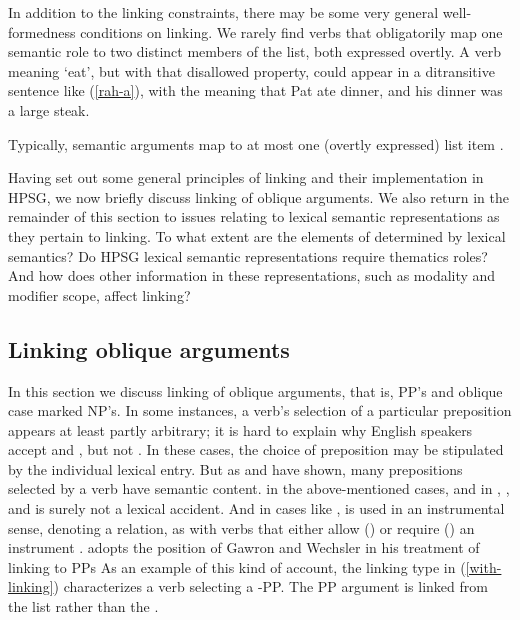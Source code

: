 \documentclass[output=paper
                ,modfonts
                ,nonflat
	        ,collection
	        ,collectionchapter
	        ,collectiontoclongg
 	        ,biblatex
                ,babelshorthands
                ,newtxmath
                ,draftmode
                ,colorlinks, citecolor=brown
]{./langsci/langscibook}
\begin{document}
In addition to the linking constraints, there may be some very general well-formedness conditions on linking.  We rarely find verbs that obligatorily map one semantic role to two distinct members of the \argst list, both expressed overtly.  A verb meaning `eat', but with that disallowed property, could appear in a ditransitive sentence like (\ref{rah-a}), with the meaning that Pat ate dinner, and his dinner was a large steak.  

\begin{exe}
\label{rah-a} 
\end{exe}

\noindent
Typically, semantic arguments map to at most one (overtly expressed) \argst list item \citep[262-268]{Davis2001}.

Having set out some general principles of linking and their implementation in HPSG, we now briefly discuss linking of oblique arguments.
We also return in the remainder of this section to issues relating to lexical semantic representations as they pertain to linking.
To what extent are the elements of \argst determined by lexical semantics?
Do HPSG lexical semantic representations require thematics roles?
And how does other information in these representations, such as modality and modifier scope, affect linking?

\subsection{Linking oblique arguments}
In this section we discuss linking of oblique arguments, that is, PP's and oblique case marked NP's.
In some instances, a verb's selection of a particular preposition appears at least partly arbitrary;
it is hard to explain why English speakers accept  and , but  not .
In these cases, the choice of preposition may be stipulated by the individual lexical entry.
But as \citet{Gawron1986} and \citet{Wechsler1995} have shown, many prepositions selected by a verb have semantic content.
 in the above-mentioned cases, and in , , and  is surely not a lexical accident.
And in  cases like ,  is used in an instrumental sense, denoting a  relation, as with verbs that either allow () or require () an instrument \citep{KoenigandDavis2006}.
\citet{Davis1996,Davis2001} adopts the position of Gawron and Wechsler in his treatment of linking to PPs
As an example of this kind of account, the linking type in (\ref{with-linking}) characterizes a verb selecting a -PP. 
The PP argument is linked from the \rels list  rather than the . 
\end{document}
